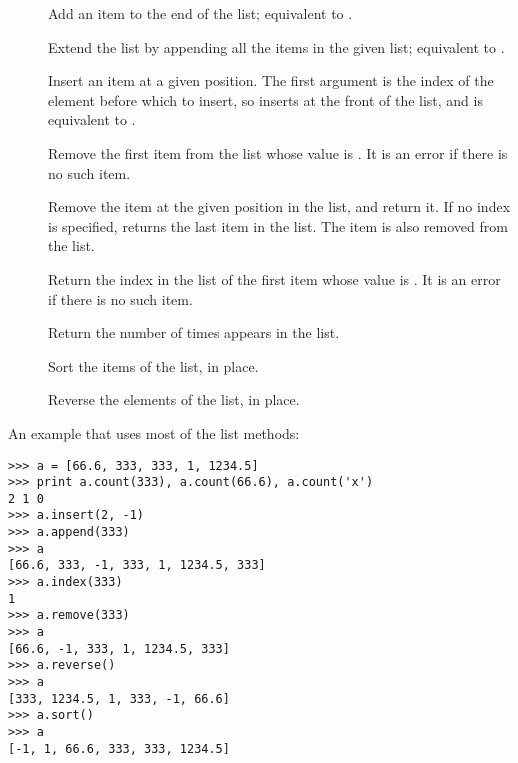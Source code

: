 \documentclass{manual}
\begin{document}
\begin{description}

\item[]
Add an item to the end of the list;
equivalent to .

\item[]
Extend the list by appending all the items in the given list;
equivalent to .

\item[]
Insert an item at a given position.  The first argument is the index of
the element before which to insert, so  inserts at
the front of the list, and  is equivalent to
.

\item[]
Remove the first item from the list whose value is .
It is an error if there is no such item.

\item[]
Remove the item at the given position in the list, and return it.  If
no index is specified,  returns the last item in the
list.  The item is also removed from the list.

\item[]
Return the index in the list of the first item whose value is .
It is an error if there is no such item.

\item[]
Return the number of times  appears in the list.

\item[]
Sort the items of the list, in place.

\item[]
Reverse the elements of the list, in place.

\end{description}

An example that uses most of the list methods:

\begin{verbatim}
>>> a = [66.6, 333, 333, 1, 1234.5]
>>> print a.count(333), a.count(66.6), a.count('x')
2 1 0
>>> a.insert(2, -1)
>>> a.append(333)
>>> a
[66.6, 333, -1, 333, 1, 1234.5, 333]
>>> a.index(333)
1
>>> a.remove(333)
>>> a
[66.6, -1, 333, 1, 1234.5, 333]
>>> a.reverse()
>>> a
[333, 1234.5, 1, 333, -1, 66.6]
>>> a.sort()
>>> a
[-1, 1, 66.6, 333, 333, 1234.5]
\end{verbatim}
\end{document}
